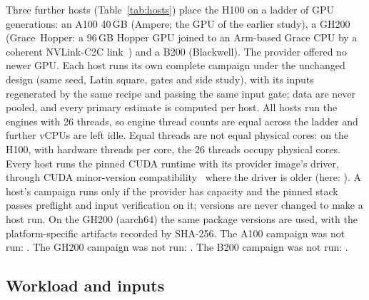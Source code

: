 \documentclass[sigconf, nonacm]{acmart}
\begin{document}
Three further hosts (Table~\ref{tab:hosts}) place the H100 on a ladder of GPU
generations: an A100 40\,GB (Ampere; the GPU of the earlier study), a GH200
(Grace~Hopper: a 96\,GB Hopper GPU joined to an Arm-based Grace CPU by a
coherent NVLink-C2C link~\citep{nvidia_gh200}) and a B200 (Blackwell). The
provider offered no newer GPU. Each host runs its own complete campaign under
the unchanged design (same seed, Latin square, gates and side study), with its
inputs regenerated by the same recipe and passing the same input gate; data are
never pooled, and every primary estimate is computed per host. All hosts run
the engines with 26 threads, so engine thread counts are equal across the
ladder and further vCPUs are left idle. Equal threads are not equal physical
cores: on the H100, with  hardware threads per
core, the 26 threads occupy  physical cores.
Every host runs the pinned CUDA runtime with its provider image's driver,
through CUDA minor-version
compatibility~\citep{nvidia_cuda_compat} where the driver is older (here:
). A host's campaign runs only if the provider
has capacity and the pinned stack passes preflight and input verification on
it; versions are never changed to make a host run. On the GH200 (aarch64) the
same package versions are used, with the platform-specific artifacts recorded
by SHA-256.
\ifaonehundredran\else
The A100 campaign was not run: .
\fi
\ifghtwohundredran\else
The GH200 campaign was not run: .
\fi
\ifbtwohundredran\else
The B200 campaign was not run: .
\fi

\subsection{Workload and inputs}
\label{sec:workload}
\end{document}
